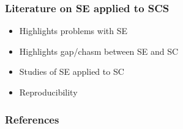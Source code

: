 \documentclass[t,12pt,numbers,fleqn]{beamer}
\begin{document}

\begin{frame}
\frametitle{Literature on SE applied to SCS}

\begin {itemize}

\item Highlights problems with SE
\item Highlights gap/chasm between SE and SC
\item Studies of SE applied to SC
\item Reproducibility

\end{itemize}

\end{frame}


\begin{frame}[allowframebreaks]
\frametitle{References}



\end{frame}

\end{document}
